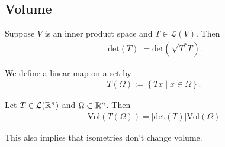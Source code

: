 \documentclass{memoir}
\begin{document}
\subsection{Volume}
\label{subsec:volume}



\begin{prop}
	Suppose \(V\) is an inner product space and \(T \in \mathcal{L}(V)\). Then
	\begin{align*}
		\left| \textrm{det}(T) \right| = \textrm{det}\left( \sqrt{T^{*}T}  \right) .
	\end{align*}
\end{prop}

We define a linear map on a set by
\begin{align*}
	T(\Omega ) := \left\{Tx \mid x \in \Omega  \right\} .
\end{align*}

\begin{prop}
	Let \(T \in \mathcal{L}(\mathbb{R}^{n})\) and \(\Omega \subset \mathbb{R}^{n}\). Then
	\begin{align*}
		\textrm{Vol}(T(\Omega )) = \left| \textrm{det}(T) \right|  \textrm{Vol}(\Omega )
	\end{align*}
\end{prop}
This also implies that isometries don't change volume.
\end{document}
